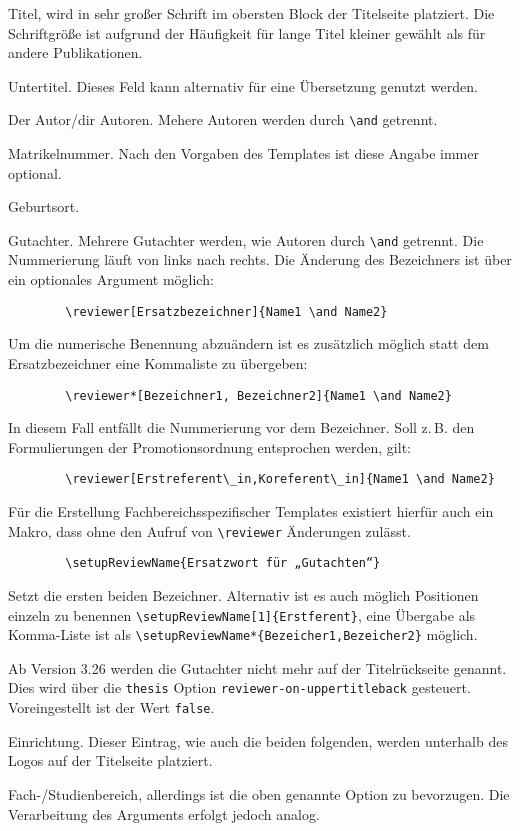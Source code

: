 \documentclass[
	german,%
	accentcolor=9c,%
	ruledheaders=chapter,%
	class=book,%
	thesis={%
			type=dr,
			dr=rernat
		},
	fontsize=11pt,%
	parskip=half-,%
	custommargins=true,%
	marginpar=false,%
]{tudapub}
\begin{document}
\begin{description}
	\item[title] Titel, wird in sehr großer Schrift im obersten Block der Titelseite platziert. Die Schriftgröße ist aufgrund der Häufigkeit für lange Titel kleiner gewählt als für andere Publikationen.
	\item[subtitle] Untertitel. Dieses Feld kann alternativ für eine Übersetzung genutzt werden.
	\item[author] Der Autor/dir Autoren. Mehere Autoren werden durch \verb+\and+ getrennt.
	\item[studentID] Matrikelnummer. Nach den Vorgaben des Templates ist diese Angabe immer optional.
	\item[birthplace] Geburtsort.
	\item[reviewer] Gutachter. Mehrere Gutachter werden, wie Autoren durch \verb+\and+ getrennt. Die Nummerierung läuft von links nach rechts.
	      Die Änderung des Bezeichners ist über ein optionales Argument möglich:
\begin{verbatim}
        \reviewer[Ersatzbezeichner]{Name1 \and Name2}
\end{verbatim}
	      Um die numerische Benennung abzuändern ist es zusätzlich möglich statt dem Ersatzbezeichner eine Kommaliste zu übergeben:
\begin{verbatim}
        \reviewer*[Bezeichner1, Bezeichner2]{Name1 \and Name2}
\end{verbatim}
	      In diesem Fall entfällt die Nummerierung vor dem Bezeichner. Soll z.\,B. den Formulierungen der Promotionsordnung entsprochen werden, gilt:
\begin{verbatim}
        \reviewer[Erstreferent\_in,Koreferent\_in]{Name1 \and Name2}
\end{verbatim}
	      Für die Erstellung Fachbereichsspezifischer Templates existiert hierfür auch ein Makro, dass ohne den Aufruf von \verb+\reviewer+ Änderungen zulässt.
\begin{verbatim}
        \setupReviewName{Ersatzwort für „Gutachten“}
\end{verbatim}
	      Setzt die ersten beiden Bezeichner. Alternativ ist es auch möglich Positionen einzeln zu benennen \verb+\setupReviewName[1]{Erstferent}+, eine Übergabe als Komma-Liste ist als \verb+\setupReviewName*{Bezeicher1,Bezeicher2}+ möglich.

	      Ab Version 3.26 werden die Gutachter nicht mehr auf der Titelrückseite genannt. Dies wird über die \verb+thesis+ Option \verb+reviewer-on-uppertitleback+ gesteuert. Voreingestellt ist der Wert \verb+false+.
	\item[institution] Einrichtung. Dieser Eintrag, wie auch die beiden folgenden, werden unterhalb des Logos auf der Titelseite platziert.
	\item[department] Fach-/Studienbereich, allerdings ist die oben genannte Option zu bevorzugen. Die Verarbeitung des Arguments erfolgt jedoch analog.


\end{description}
\end{document}
